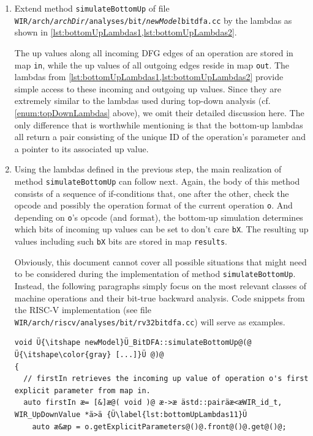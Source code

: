 \begin{enumerate}[resume]
  \item Extend method \texttt{simulateBottomUp} of file \texttt{WIR/arch/{\itshape archDir}/analyses/bit/{\itshape newModel}bitdfa.cc} by the lambdas as shown in \cref{lst:bottomUpLambdas1,lst:bottomUpLambdas2}.

  The up values along all incoming \gls{DFG} edges of an operation are stored in map \texttt{in}, while the up values of all outgoing edges reside in map \texttt{out}.
  The lambdas from \cref{lst:bottomUpLambdas1,lst:bottomUpLambdas2} provide simple access to these incoming and outgoing up values.
  Since they are extremely similar to the lambdas used during top-down analysis (cf. \cref{enum:topDownLambdas} above), we omit their detailed discussion here.
  The only difference that is worthwhile mentioning is that the bottom-up lambdas all return a pair consisting of the unique ID of the operation's parameter and a pointer to its associated up value.

  \item Using the lambdas defined in the previous step, the main realization of method \texttt{simulateBottomUp} can follow next.
  Again, the body of this method consists of a sequence of if-conditions that, one after the other, check the opcode and possibly the operation format of the current operation \texttt{o}.
  And depending on \texttt{o}'s opcode (and format), the bottom-up simulation determines which bits of incoming up values can be set to don't care \texttt{bX}.
  The resulting up values including such \texttt{bX} bits are stored in map \texttt{results}.

  Obviously, this document cannot cover all possible situations that might need to be considered during the implementation of method \texttt{simulateBottomUp}.
  Instead, the following paragraphs simply focus on the most relevant classes of machine operations and their bit-true backward analysis.
  Code snippets from the RISC-V implementation (see file \texttt{WIR/arch/riscv/analyses/bit/rv32bitdfa.cc}) will serve as examples.

\begin{lstlisting}[style=code,float=!t,caption={Definition of Lambdas for Bottom-Up Analysis},label=lst:bottomUpLambdas1]
void Ü{\itshape newModel}Ü_BitDFA::simulateBottomUp@(@ Ü{\itshape\color{gray} [...]}Ü @)@
{
  // firstIn retrieves the incoming up value of operation o's first explicit parameter from map in.
  auto firstIn æ= [&]æ@( void )@ æ->æ ästd::pairäæ<æWIR_id_t, WIR_UpDownValue *ä>ä {Ü\label{lst:bottomUpLambdas11}Ü
    auto æ&æp = o.getExplicitParameters@()@.front@()@.get@()@;


\end{lstlisting}
\end{enumerate}
